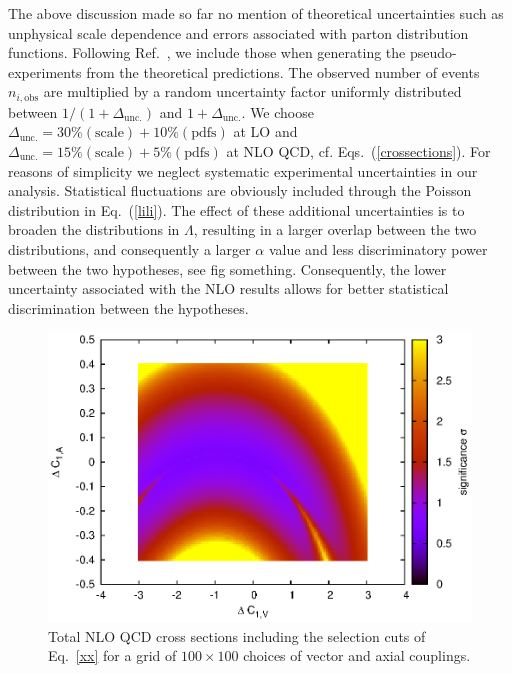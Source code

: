\documentclass[preprint]{JHEP3} %
\begin{document}
The above discussion made so far no mention of theoretical uncertainties such as unphysical scale dependence and errors associated with parton distribution functions.
Following Ref.~\cite{Lykken et al}, we include those when generating the pseudo-experiments from the theoretical predictions. 
The observed number of events $n_{i,\mathrm{obs}}$ are multiplied by a random uncertainty factor uniformly distributed 
between $1/(1+\Delta_\mathrm{unc.})$ and $1+\Delta_\mathrm{unc.}$.
We choose $\Delta_\mathrm{unc.} = 30\% (\mathrm{scale}) + 10\%(\mathrm{pdfs})$ at LO
and $\Delta_\mathrm{unc.} = 15\% (\mathrm{scale}) + 5\%(\mathrm{pdfs})$ at NLO QCD, cf. Eqs.~(\ref{crossections}).
For reasons of simplicity we neglect systematic experimental uncertainties in our analysis. 
Statistical fluctuations are obviously included through the Poisson distribution in Eq.~(\ref{lili}).
The effect of these additional uncertainties is to broaden the distributions in $\Lambda$, 
resulting in a larger overlap between the two distributions, and consequently a larger $\alpha$ value and less discriminatory power between the two hypotheses, 
see fig something. Consequently, the lower uncertainty associated with the NLO results allows for better statistical discrimination between the hypotheses.

\begin{figure}[t]
\centering
\includegraphics[scale=0.6]{BLLLO1223HSsig_SUA2_300_1.30.eps}
\caption{ \label{fig:viii} Total NLO QCD cross sections including the selection cuts of Eq.~\ref{xx} for a 
grid of $ 100 \times 100 $ choices of vector and axial couplings. }
\end{figure}
\end{document}
